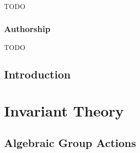 \documentclass[12pt,a4paper]{book}
\theoremstyle{theorem}
\theoremstyle{definition}
\theoremstyle{remark}
\begin{document}
TODO




\newpage
\section*{Authorship}

TODO




\tableofcontents
{} %



\mainmatter

\cleardoublepage
{}
{}
\chapter*{Introduction}






\part{Invariant Theory}\label{part:InvariantTheory}

\chapter{Algebraic Group Actions} \label{ch:AlgebraicGroupActions}
\end{document}
